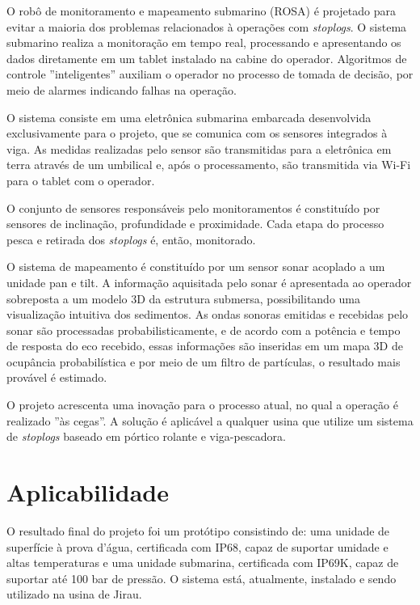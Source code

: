 O robô de monitoramento e mapeamento submarino (ROSA) é projetado para evitar a
maioria dos problemas relacionados à operações com \textit{stoplogs}. O sistema
submarino realiza a monitoração em tempo real, processando e apresentando os
dados diretamente em um tablet instalado na cabine do operador. Algoritmos de
controle ''inteligentes'' auxiliam o operador no processo de tomada de decisão,
por meio de alarmes indicando falhas na operação.

O sistema consiste em uma eletrônica submarina embarcada desenvolvida
exclusivamente para o projeto, que se comunica com os sensores integrados à
viga. As medidas realizadas pelo sensor são transmitidas para a
eletrônica em terra através de um umbilical e, após o processamento, são
transmitida via Wi-Fi para o tablet com o operador.

O conjunto de sensores responsáveis pelo monitoramentos é constituído por
sensores de inclinação, profundidade e proximidade. Cada etapa do processo pesca
e retirada dos \textit{stoplogs} é, então, monitorado.

O sistema de mapeamento é constituído por um sensor sonar acoplado a um unidade
pan e tilt. A informação aquisitada pelo sonar é apresentada ao operador
sobreposta a um modelo 3D da estrutura submersa, possibilitando uma visualização
intuitiva dos sedimentos. As ondas sonoras emitidas e recebidas pelo sonar são
processadas probabilisticamente, e de acordo com a potência e tempo de resposta
do eco recebido, essas informações são inseridas em um mapa 3D de ocupância
probabilística e por meio de um filtro de partículas, o resultado mais provável
é estimado.

O projeto acrescenta uma inovação para o processo atual, no qual a operação é
realizado ''às cegas''. A solução é aplicável a qualquer usina que utilize um
sistema de \textit{stoplogs} baseado em pórtico rolante e viga-pescadora.


\section{Aplicabilidade}

O resultado final do projeto foi um protótipo consistindo de: uma unidade de
superfície à prova d'água, certificada com IP68, capaz de suportar umidade e
altas temperaturas e uma unidade submarina, certificada com IP69K, capaz de
suportar até 100 bar de pressão. O sistema está, atualmente, instalado e sendo
utilizado na usina de Jirau.


